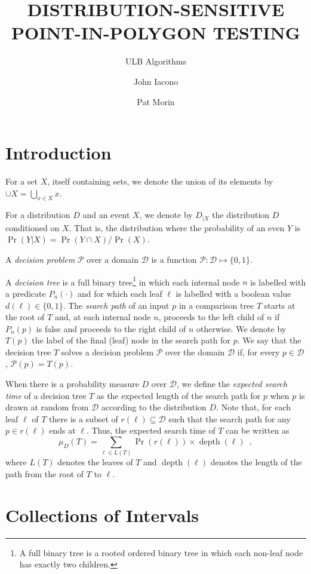 \documentclass[charterfonts,lotsofwhite]{patmorin}
\title{\MakeUppercase{Distribution-Sensitive Point-in-Polygon Testing}}
\author{ULB Algorithms \and John Iacono \and Pat Morin}
\date{}
\DeclareMathOperator{\depth}{depth}
\begin{document}
\maketitle

\section{Introduction}


For a set $X$, itself containing sets, we denote the union of its
elements by $\cup X=\bigcup_{x\in X} x$.

For a distribution $D$ and an event $X$, we denote by $D_{|X}$ the
distribution $D$ conditioned on $X$.  That is, the distribution where 
the probability of an even $Y$ is
$\Pr(Y|X)=\Pr(Y\cap X)/\Pr(X)$.

A \emph{decision problem} $\mathcal{P}$ over a domain $\mathcal{D}$ is
a function $\mathcal{P}:\mathcal{D}\mapsto \{0,1\}$.

A \emph{decision tree} is a full binary tree\footnote{A full binary
tree is a rooted ordered binary tree in which each non-leaf node has
exactly two children.} in which each internal node $n$ is labelled
with a predicate $P_n(\cdot)$ and for which each leaf $\ell$ is
labelled with a boolean value $d(\ell)\in\{0,1\}$. The \emph{search
path} of an input $p$ in a comparison tree $T$ starts at the root of
$T$ and, at each internal node $n$, proceeds to the left child of $n$
if $P_n(p)$ is false and proceeds to the right child of $n$ otherwise.
We denote by $T(p)$ the label of the final (leaf) node in the search
path for $p$.  We say that the decision tree $T$ solves a decision
problem $\mathcal{P}$ over the domain $\mathcal{D}$ if, for every $p\in
\mathcal{D}$, $\mathcal{P}(p)=T(p)$.

When there is a probability measure $D$ over $\mathcal{D}$, we define
the \emph{expected search time} of a decision tree $T$ as the expected
length of the search path for $p$ when $p$ is drawn at random from
$\mathcal{D}$ according to the distribution $D$.  Note that, for each
leaf $\ell$ of $T$ there is a subset of $r(\ell)\subseteq \mathcal{D}$
such that the search path for any $p\in r(\ell)$ ends at $\ell$.
Thus, the expected search time of $T$ can be written as
\[
     \mu_D(T) = \sum_{\ell\in L(T)} \Pr(r(\ell))\times \depth(\ell)
	\enspace ,
\]
where $L(T)$ denotes the leaves of $T$ and $\depth(\ell)$ denotes the
length of the path from the root of $T$ to $\ell$.


\section{Collections of Intervals}
\end{document}
